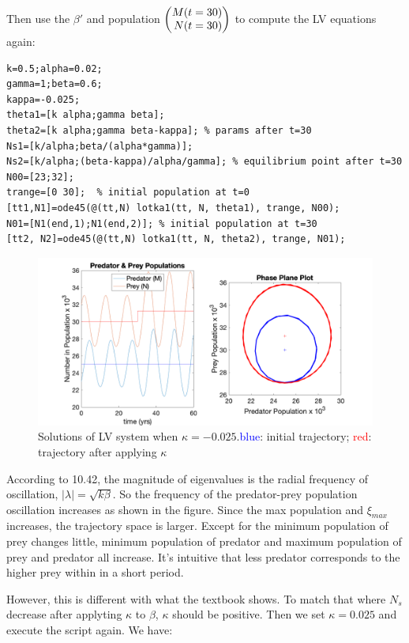 \documentclass[12pt,a4paper]{article}
\begin{document}
Then use the $\beta'$ and population $\newvec{M(t=30)\\N(t=30)}$ to compute the LV equations again: 
\begin{lstlisting}
k=0.5;alpha=0.02;
gamma=1;beta=0.6;
kappa=-0.025;
theta1=[k alpha;gamma beta];
theta2=[k alpha;gamma beta-kappa]; % params after t=30
Ns1=[k/alpha;beta/(alpha*gamma)];
Ns2=[k/alpha;(beta-kappa)/alpha/gamma]; % equilibrium point after t=30
N00=[23;32];
trange=[0 30];  % initial population at t=0
[tt1,N1]=ode45(@(tt,N) lotka1(tt, N, theta1), trange, N00);
N01=[N1(end,1);N1(end,2)]; % initial population at t=30
[tt2, N2]=ode45(@(tt,N) lotka1(tt, N, theta2), trange, N01);
\end{lstlisting}
\begin{figure}[!ht]
    \includegraphics[width=\textwidth]{hw10_7.png}
    \caption{Solutions of LV system when $\kappa=-0.025$.\textcolor{blue}{blue}: initial trajectory; \textcolor{red}{red}: trajectory after applying $\kappa$}
\end{figure}

According to 10.42, the magnitude of eigenvalues is the radial frequency of oscillation, $|\lambda|=\sqrt{k\beta}$. So the frequency of the predator-prey population oscillation increases as shown in the figure. Since the max population and $\xi_{max}$ increases, the trajectory space is larger. Except for the minimum population of prey changes little, minimum population of predator and maximum population of prey and predator all increase. It's intuitive that less predator corresponds to the higher prey within in a short period. 

However, this is different with what the textbook shows. To match that where $N_s$ decrease after applyting $\kappa$ to $\beta$, $\kappa$ should be positive. Then we set $\kappa=0.025$ and execute the script again. We have:
\end{document}
